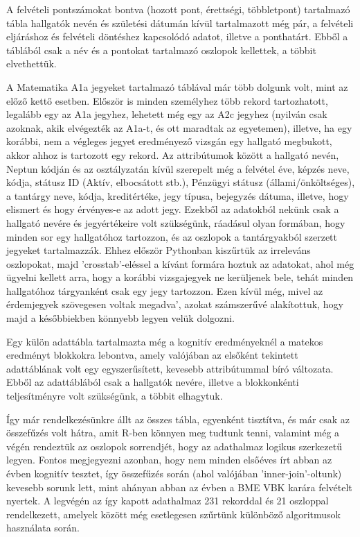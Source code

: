 \documentclass[12pt]{article}
\begin{document}
A felvételi pontszámokat bontva (hozott pont, érettségi, többletpont) tartalmazó tábla hallgatók nevén és születési dátumán kívül tartalmazott még pár, a felvételi eljáráshoz és felvételi döntéshez kapcsolódó adatot, illetve a ponthatárt. Ebből a táblából csak a név és a pontokat tartalmazó oszlopok kellettek, a többit elvethettük.

A Matematika A1a jegyeket tartalmazó táblával már több dolgunk volt, mint az előző kettő esetben. Először is minden személyhez több rekord tartozhatott, legalább egy az A1a jegyhez, lehetett még egy az A2c jegyhez (nyilván csak azoknak, akik elvégezték az A1a-t, és ott maradtak az egyetemen), illetve, ha egy korábbi, nem a végleges jegyet eredményező vizsgán egy hallgató megbukott, akkor ahhoz is tartozott egy rekord. Az attribútumok között a hallgató nevén, Neptun kódján és az osztályzatán kívül szerepelt még a felvétel éve, képzés neve, kódja, státusz ID (Aktív, elbocsátott stb.), Pénzügyi státusz (állami/önköltséges), a tantárgy neve, kódja, kreditértéke, jegy típusa, bejegyzés dátuma, illetve, hogy elismert és hogy érvényes-e az adott jegy. Ezekből az adatokból nekünk csak a hallgató nevére és jegyértékeire volt szükségünk, ráadásul olyan formában, hogy minden sor egy hallgatóhoz tartozzon, és az oszlopok a tantárgyakból szerzett jegyeket tartalmazzák. Ehhez először Pythonban kiszűrtük az irreleváns oszlopokat, majd ’crosstab’-eléssel a kívánt formára hoztuk az adatokat, ahol még ügyelni kellett arra, hogy a korábbi vizsgajegyek ne kerüljenek bele, tehát minden hallgatóhoz tárgyanként csak egy jegy tartozzon. Ezen kívül még, mivel az érdemjegyek szövegesen voltak megadva’, azokat számszerűvé alakítottuk, hogy majd a későbbiekben könnyebb legyen velük dolgozni.

Egy külön adattábla tartalmazta még a kognitív eredményeknél a matekos eredményt blokkokra lebontva, amely valójában az elsőként tekintett adattáblának volt egy egyszerűsített, kevesebb attribútummal bíró változata. Ebből az adattáblából csak a hallgatók nevére, illetve a blokkonkénti teljesítményre volt szükségünk, a többit elhagytuk.

Így már rendelkezésünkre állt az összes tábla, egyenként tisztítva, és már csak az összefűzés volt hátra, amit R-ben könnyen meg tudtunk tenni, valamint még a végén rendeztük az oszlopok sorrendjét, hogy az adathalmaz logikus szerkezetű legyen. Fontos megjegyezni azonban, hogy nem minden elsőéves írt abban az évben kognitív tesztet, így összefűzés során (ahol valójában ’inner-join’-oltunk) kevesebb sorunk lett, mint ahányan abban az évben a BME VBK karára felvételt nyertek.
A legvégén az így kapott adathalmaz 231 rekorddal és 21 oszloppal rendelkezett, amelyek között még esetlegesen szűrtünk különböző algoritmusok használata során.
\end{document}
